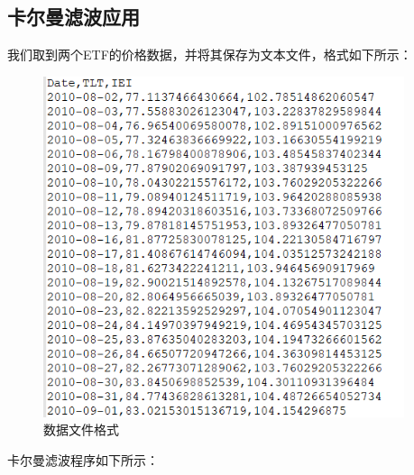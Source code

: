 \documentclass{article}
\begin{document}
\subsection{卡尔曼滤波应用}
我们取到两个ETF的价格数据，并将其保存为文本文件，格式如下所示：
\begin{figure}[H]
	\caption{数据文件格式}
	\label{f000055}
	\centering
	\includegraphics[height=10cm]{images/f000055}
\end{figure}
卡尔曼滤波程序如下所示：
\end{document}

